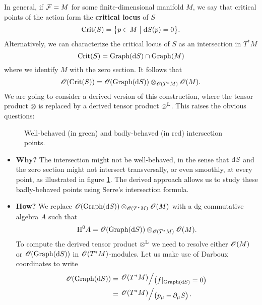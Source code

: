 \begin{example}
  In general, if $\mathcal{F} = M$ for some finite-dimensional manifold $M$, we say that critical points of the action form the \textbf{critical locus} of $S$
  \begin{equation*}
    \operatorname{Crit} (S) = \bigl\{ p \in M \bigm| \mathrm{d} S (p) = 0 \bigr\}.
  \end{equation*}
  Alternatively, we can characterize the critical locus of $S$ as an intersection in $T^* M$
  \begin{equation*}
    \operatorname{Crit} (S) = \operatorname{Graph}( \mathrm{d} S) \cap \operatorname{Graph} (M)
  \end{equation*}
  where we identify $M$ with the zero section. It follows that
  \begin{equation*}
    \mathscr{O}( \operatorname{Crit} (S) ) =
    \mathscr{O}( \operatorname{Graph} (\mathrm{d} S ) ) \otimes_{\mathscr{O}(T^* M)} \mathscr{O}(M).
  \end{equation*}
  We are going to consider a derived version of this construction, where the tensor product $\otimes$ is replaced by a derived tensor product $\otimes^{\mathbb{L}}$. This raises the obvious questions:
  \begin{figure}[ht]
    
    \centering
    \caption{Well-behaved (in green) and badly-behaved (in red) intersection points.}
    \label{fig:bad_intersections}
  \end{figure}
  \begin{itemize}
    \item \textbf{Why?} The intersection might not be well-behaved, in the sense that $\mathrm{d} S$ and the zero section might not intersect transversally, or even smoothly, at every point, as illustrated in figure \ref{fig:bad_intersections}. The derived approach allows us to study these badly-behaved points using Serre's intersection formula.
    \item \textbf{How?} We replace $\mathscr{O} (\operatorname{Graph}(\mathrm{d} S)) \otimes_{\mathscr{O} (T^*M)} \mathscr{O}(M)$ with a dg commutative algebra $A$ such that
    \begin{equation*}
      \mathrm{H}^0 A = \mathscr{O} (\operatorname{Graph}(\mathrm{d} S)) \otimes_{\mathscr{O} (T^*M)} \mathscr{O}(M).
    \end{equation*}
    To compute the derived tensor product $\otimes^{\mathbb{L}}$ we need to resolve either $\mathscr{O}(M)$ or $\mathscr{O}(\operatorname{Graph}(\mathrm{d} S))$ in $\mathscr{O}(T^* M)$-modules. Let us make use of Darboux coordinates to write
    \begin{align*}
      \Oscr(\Graph(\drm S)) &=
      \bigslant{\Oscr(T^* M)}{ \bigl( f \vert_{\Graph(\drm S)} = 0 \bigr) } \\
                            &= \bigslant{ \Oscr( T^* M )}{ \bigl( p_{\mu} - \partial_\mu S \bigr) }.

\end{align*}
\end{itemize}
\end{example}
